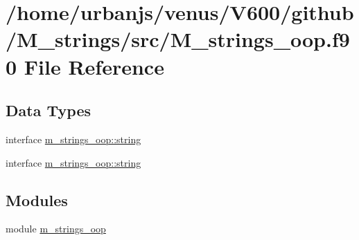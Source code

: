 \hypertarget{M__strings__oop_8f90}{}\section{/home/urbanjs/venus/\+V600/github/\+M\+\_\+strings/src/\+M\+\_\+strings\+\_\+oop.f90 File Reference}
\label{M__strings__oop_8f90}
\subsection*{Data Types}
\begin{DoxyCompactItemize}
\item 
interface \mbox{\hyperlink{structm__strings__oop_1_1string}{m\+\_\+strings\+\_\+oop\+::string}}
\item 
interface \mbox{\hyperlink{structm__strings__oop_1_1string}{m\+\_\+strings\+\_\+oop\+::string}}
\end{DoxyCompactItemize}
\subsection*{Modules}
\begin{DoxyCompactItemize}
\item 
module \mbox{\hyperlink{namespacem__strings__oop}{m\+\_\+strings\+\_\+oop}}
\end{DoxyCompactItemize}
